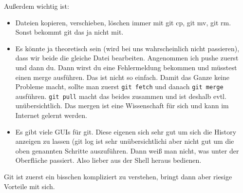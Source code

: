 \documentclass[a4paper,ngerman]{scrartcl} %
\begin{document}
Außerdem wichtig ist:
\begin{itemize}
\item Dateien kopieren, verschieben, löschen immer mit git cp, git mv, git rm. Sonst bekommt git das ja nicht mit.
\item Es könnte ja theoretisch sein (wird bei uns wahrscheinlich nicht passieren), dass wir beide die gleiche Datei bearbeiten. Angenommen ich pushe zuerst und dann du. Dann wirst du eine Fehlermeldung bekommen und müsstest einen merge ausführen. Das ist nicht so einfach. Damit das Ganze keine Probleme macht, sollte man zuerst \verb|git fetch| und danach \verb|git merge| ausführen. \verb|git pull| macht das beides zusammen und ist deshalb evtl. unübersichtlich. Das mergen ist eine Wissenschaft für sich und kann im Internet gelernt werden.
\item Es gibt viele GUIs für git. Diese eigenen sich sehr gut um sich die History anzeigen zu lassen (git log ist sehr unübersichtlich^^) aber nicht gut um die oben genannten Schritte auszuführen. Dann weiß man nicht, was unter der Oberfläche passiert. Also lieber aus der Shell heraus bedienen.
\end{itemize}

Git ist zuerst ein bisschen kompliziert zu verstehen, bringt dann aber riesige Vorteile mit sich.
\end{document}
